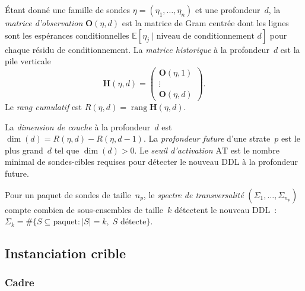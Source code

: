 \documentclass[12pt,a4paper]{article}
\begin{document}
\begin{definition}
\label{def:obs_matrix}
Étant donné une famille de sondes $\eta = (\eta_1, \ldots, \eta_n)$ et
une profondeur~$d$, la \emph{matrice d'observation} $\mathbf{O}(\eta,
d)$ est la matrice de Gram centrée dont les lignes sont les
espérances conditionnelles
$\mathbb{E}[\eta_j \mid \text{niveau de conditionnement } d]$
pour chaque résidu de conditionnement. La \emph{matrice historique}
à la profondeur~$d$ est la pile verticale
\[
  \mathbf{H}(\eta, d) = \begin{pmatrix}
    \mathbf{O}(\eta, 1) \\ \vdots \\ \mathbf{O}(\eta, d)
  \end{pmatrix}.
\]
Le \emph{rang cumulatif} est
$R(\eta, d) = \operatorname{rang} \mathbf{H}(\eta, d)$.
\end{definition}

\begin{definition}
\label{def:layer_AT}
La \emph{dimension de couche} à la profondeur~$d$ est
$\dim(d) = R(\eta, d) - R(\eta, d{-}1)$.
La \emph{profondeur future} d'une strate~$p$ est le plus grand~$d$
tel que $\dim(d) > 0$.
Le \emph{seuil d'activation} $\mathrm{AT}$ est le nombre minimal de
sondes-cibles requises pour détecter le nouveau DDL à la profondeur
future.
\end{definition}

\begin{definition}
\label{def:sigma}
Pour un paquet de sondes de taille~$n_p$, le \emph{spectre de
transversalité} $(\Sigma_1, \ldots, \Sigma_{n_p})$ compte combien de
sous-ensembles de taille~$k$ détectent le nouveau DDL~:
$\Sigma_k = \#\{S \subseteq \text{paquet} : |S| = k,\;
S \text{ détecte}\}$.
\end{definition}


\subsection{Instanciation crible}
\label{sec:PM_sieve}

\subsubsection{Cadre}
\end{document}
